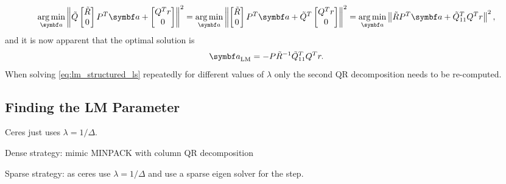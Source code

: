 \begin{equation*}
  \argmin_{\a} \left\| \tilde Q \begin{bmatrix} \tilde R \\ 0 \end{bmatrix} P^{T} \a + \begin{bmatrix} Q^{T} r \\ 0 \end{bmatrix} \right\|^2 =
  \argmin_{\a} \left\| \begin{bmatrix} \tilde R \\ 0 \end{bmatrix} P^{T} \a + \tilde Q^{T} \begin{bmatrix} Q^{T} r \\ 0 \end{bmatrix} \right\|^2 = \argmin_{\a} \left\| \tilde R P^{T} \a + \tilde Q_{11}^{T} Q^{T} r \right\|^{2},
\end{equation*}
and it is now apparent that the optimal solution is
\begin{equation}
  \label{eq:5}
  \a_{\textrm{LM}} = - P \tilde R^{-1} \tilde Q_{11}^{T} Q^{T} r.
\end{equation}
When solving \eqref{eq:lm_structured_ls} repeatedly for different values of $\lambda$ only the second QR decomposition needs to be re-computed.

\subsection{Finding the LM Parameter}


\begin{remark}
  Ceres just uses $\lambda = 1 / \Delta$.

  Dense strategy: mimic MINPACK with column QR decomposition

  Sparse strategy: as ceres use $\lambda = 1 / \Delta$ and use a sparse eigen solver for the step.
\end{remark}


